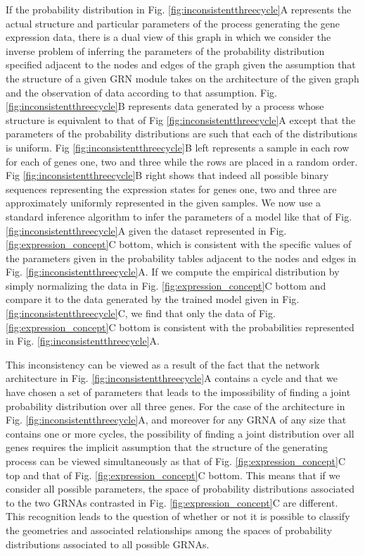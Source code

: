 If the probability distribution in Fig. \ref{fig:inconsistentthreecycle}A represents the actual structure and particular parameters of the process generating the gene expression data, there is a dual view of this graph in which we consider the inverse problem of inferring the parameters of the probability distribution specified adjacent to the nodes and edges of the graph given the assumption that the structure of a given GRN module takes on the architecture of the given graph and the observation of data according to that assumption. Fig. \ref{fig:inconsistentthreecycle}B represents data generated by a process whose structure is equivalent to that of Fig \ref{fig:inconsistentthreecycle}A except that the parameters of the probability distributions are such that each of the distributions is uniform. Fig \ref{fig:inconsistentthreecycle}B left represents a sample in each row for each of genes one, two and three while the rows are placed in a random order. Fig \ref{fig:inconsistentthreecycle}B right shows that indeed all possible binary sequences representing the expression states for genes one, two and three are approximately uniformly represented in the given samples. We now use a standard inference algorithm to infer the parameters of a model like that of Fig. \ref{fig:inconsistentthreecycle}A given the dataset represented in Fig. \ref{fig:expression_concept}C bottom, which is consistent with the specific values of the parameters given in the probability tables adjacent to the nodes and edges in Fig. \ref{fig:inconsistentthreecycle}A. If we compute the empirical distribution by simply normalizing the data in Fig. \ref{fig:expression_concept}C bottom and compare it to the data generated by the trained model given in Fig. \ref{fig:inconsistentthreecycle}C, we find that only the data of Fig. \ref{fig:expression_concept}C bottom is consistent with the probabilities represented in Fig. \ref{fig:inconsistentthreecycle}A.

This inconsistency can be viewed as a result of the fact that the network architecture in Fig. \ref{fig:inconsistentthreecycle}A contains a cycle and that we have chosen a set of parameters that leads to the impossibility of finding a joint probability distribution over all three genes. For the case of the architecture in Fig. \ref{fig:inconsistentthreecycle}A, and moreover for any GRNA of any size that contains one or more cycles, the possibility of finding a joint distribution over all genes requires the implicit assumption that the structure of the generating process can be viewed simultaneously as that of Fig. \ref{fig:expression_concept}C top and that of Fig. \ref{fig:expression_concept}C bottom. This means that if we consider all possible parameters, the space of probability distributions associated to the two GRNAs contrasted in Fig. \ref{fig:expression_concept}C are different. This recognition leads to the question of whether or not it is possible to classify the geometries and associated relationships among the spaces of probability distributions associated to all possible GRNAs.

